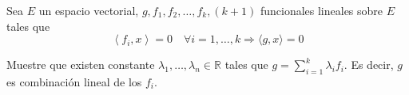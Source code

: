 Sea $E$ un espacio vectorial, $g, f_1, f_2, \ldots, f_k,(k+1)$ funcionales lineales sobre $E$ tales que
$$
\left\langle f_i, x\right\rangle=0 \quad \forall i=1, \ldots, k \Longrightarrow\langle g, x\rangle=0
$$

Muestre que existen constante $\lambda_1, \ldots, \lambda_n \in \mathbb{R}$ tales que $g=\sum_{i=1}^k \lambda_i f_i$. Es decir, $g$ es combinación lineal de los $f_i$.